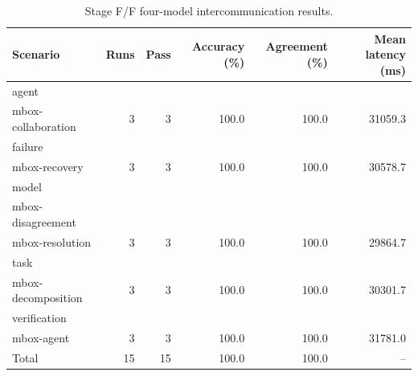 \begin{table}[t]
\centering
\caption{Stage F/F four-model intercommunication results.}
\label{tab:stageff_four_model_results}
\begin{tabular}{lrrrrr}
\toprule
Scenario & Runs & Pass & Accuracy (\%) & Agreement (\%) & Mean latency (ms) \\
\midrule
agent\\mbox{-}collaboration & 3 & 3 & 100.0 & 100.0 & 31059.3 \\
failure\\mbox{-}recovery & 3 & 3 & 100.0 & 100.0 & 30578.7 \\
model\\mbox{-}disagreement\\mbox{-}resolution & 3 & 3 & 100.0 & 100.0 & 29864.7 \\
task\\mbox{-}decomposition & 3 & 3 & 100.0 & 100.0 & 30301.7 \\
verification\\mbox{-}agent & 3 & 3 & 100.0 & 100.0 & 31781.0 \\
\midrule
Total & 15 & 15 & 100.0 & 100.0 & -- \\
\bottomrule
\end{tabular}
\end{table}

